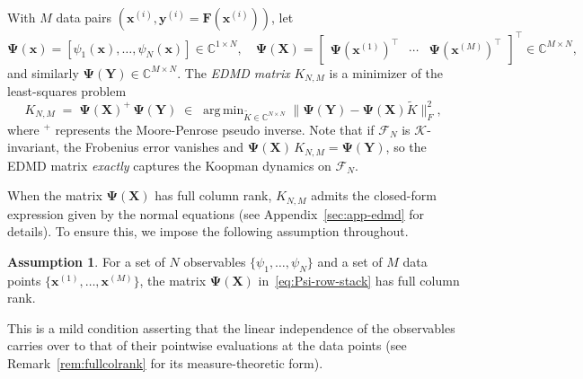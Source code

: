 \documentclass{article}
\theoremstyle{plain}
\theoremstyle{definition}
\newtheorem{assumption}{Assumption}
\DeclareMathOperator*{\argmin}{arg\,min}
\def\tp{\intercal}
\def\X{\mathbf{X}}
\def\x{\mathbf{x}}
\def\Y{\mathbf{Y}}
\def\y{\mathbf{y}}
\def\Koop{\mathcal{K}}
\def\Fc{\mathcal{F}}
\newcommand{\arXivtag}[1][]{#1}
\begin{document}
	With $M$ data pairs $(\x^{(i)}, \y^{(i)} = \mathbf{F}(\x^{(i)}))$, let
	\begin{equation}\label{eq:Psi-row-stack}
		\mathbf{\Psi}(\x) = [\psi_1(\x), \ldots, \psi_N(\x)] \in \mathbb{C}^{1\times N},
		\quad
		\mathbf{\Psi}(\X) =\begin{bmatrix} \mathbf{\Psi}(\x^{(1)})^{\tp} & \cdots & \mathbf{\Psi}(\x^{(M)})^{\tp} \end{bmatrix}^{\tp} \in \mathbb{C}^{M\times N},
	\end{equation}
	and similarly $\mathbf{\Psi}(\Y) \in \mathbb{C}^{M\times N}$. The \emph{EDMD matrix} $K_{N,M}$ is a minimizer of the least-squares problem
	\begin{equation}\label{eq:EDMD-mat-formula}
		K_{N,M} \;=\; \mathbf{\Psi}(\X)^{+}\,\mathbf{\Psi}(\Y) \;\in\; \argmin_{\tilde{K} \in \mathbb{C}^{N \times N}} \bigl\|\mathbf{\Psi}(\Y) - \mathbf{\Psi}(\X)\tilde{K}\bigr\|_F^2,
	\end{equation}
    \arXivtag[where $^{+}$ represents the Moore-Penrose pseudo inverse.] 
    Note that if $\Fc_N$ is $\Koop$-invariant, the Frobenius error vanishes and $\mathbf{\Psi}(\X)\,K_{N,M} = \mathbf{\Psi}(\Y)$, so the EDMD matrix \arXivtag[\textit{exactly}] captures the Koopman dynamics on $\Fc_N$. \arXivtag
    
    When the matrix $\mathbf{\Psi}(\X)$ has full column rank, $K_{N,M}$ admits the closed-form expression given by the normal equations (see Appendix~\ref{sec:app-edmd} for details). To ensure this, we impose the following assumption throughout.
	
	\begin{assumption}\label{assume:full-rank}
		For a set of $N$ observables $\{\psi_1, \ldots, \psi_N\}$ and a set of $M$ data points $\{\mathbf{x}^{(1)}, \ldots, \mathbf{x}^{(M)}\}$, the matrix $\mathbf{\Psi}(\X)$ in~\eqref{eq:Psi-row-stack} has full column rank.
	\end{assumption}
	This is a mild condition asserting that the linear independence of the observables carries over to that of their pointwise evaluations at the data points (see Remark~\ref{rem:fullcolrank} for its measure-theoretic form).
	
\end{document}
